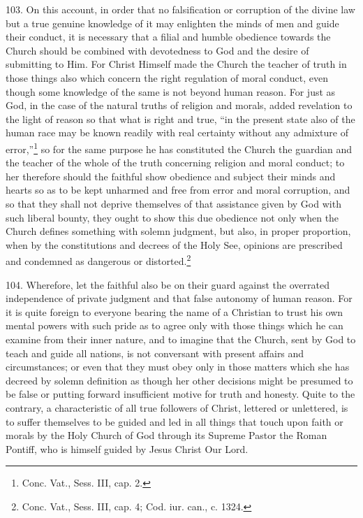 \documentclass[12pt,a4paper]{book}
\begin{document}
103. On this account, in order that no falsification or corruption of the divine law but a true genuine knowledge of it may enlighten the minds of men and guide their conduct, it is necessary that a filial and humble obedience towards the Church should be combined with devotedness to God and the desire of submitting to Him. For Christ Himself made the Church the teacher of truth in those things also which concern the right regulation of moral conduct, even though some knowledge of the same is not beyond human reason. For just as God, in the case of the natural truths of religion and morals, added revelation to the light of reason so that what is right and true, ``in the present state also of the human race may be known readily with real certainty without any admixture of error,''\footnote{Conc. Vat., Sess. III, cap. 2.} so for the same purpose he has constituted the Church the guardian and the teacher of the whole of the truth concerning religion and moral conduct; to her therefore should the faithful show obedience and subject their minds and hearts so as to be kept unharmed and free from error and moral corruption, and so that they shall not deprive themselves of that assistance given by God with such liberal bounty, they ought to show this due obedience not only when the Church defines something with solemn judgment, but also, in proper proportion, when by the constitutions and decrees of the Holy See, opinions are prescribed and condemned as dangerous or distorted.\footnote{Conc. Vat., Sess. III, cap. 4; Cod. iur. can., c. 1324.}

104. Wherefore, let the faithful also be on their guard against the overrated independence of private judgment and that false autonomy of human reason. For it is quite foreign to everyone bearing the name of a Christian to trust his own mental powers with such pride as to agree only with those things which he can examine from their inner nature, and to imagine that the Church, sent by God to teach and guide all nations, is not conversant with present affairs and circumstances; or even that they must obey only in those matters which she has decreed by solemn definition as though her other decisions might be presumed to be false or putting forward insufficient motive for truth and honesty. Quite to the contrary, a characteristic of all true followers of Christ, lettered or unlettered, is to suffer themselves to be guided and led in all things that touch upon faith or morals by the Holy Church of God through its Supreme Pastor the Roman Pontiff, who is himself guided by Jesus Christ Our Lord.
\end{document}
